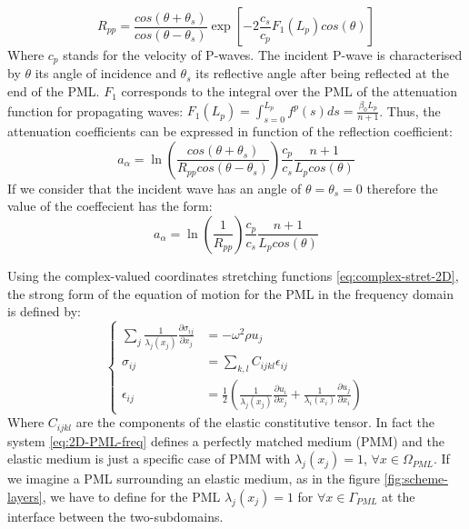 \begin{equation}
R_{pp} = \frac{cos(\theta+\theta_s)}{cos(\theta-\theta_s)} \exp\left[-2\frac{c_s}{c_p}F_1(L_p)cos(\theta)\right]
\label{eq:Rpp} 
\end{equation} 
Where $c_p$ stands for the velocity of P-waves. The incident P-wave is characterised by $\theta$ its angle of incidence and $\theta_s$ its reflective angle after being reflected at the end of the PML. $F_1$ corresponds to the integral over the PML of the attenuation function for propagating waves: $F_1(L_p) = \int_{s=0}^{L_p} f^p(s) ds = \frac{\beta_0 L_p}{n+1}$. Thus, the attenuation coefficients can be expressed in function of the reflection coefficient:
\begin{equation}
a_\alpha = \ln\left(\frac{cos(\theta+\theta_s)}{R_{pp}cos(\theta-\theta_s)} \right) \frac{c_p}{c_s} \frac{n+1}{L_p cos(\theta)}
\label{eq:alpha_kucu}
\end{equation} 
If we consider that the incident wave has an angle of $\theta = \theta_s = 0$ therefore the value of the coeffecient has the form:
\begin{equation}
a_\alpha = \ln\left(\frac{1}{R_{pp}} \right) \frac{c_p}{c_s} \frac{n+1}{L_p cos(\theta)}
\end{equation}
\par Using the complex-valued coordinates stretching functions \ref{eq:complex-stret-2D}, the strong form of the equation of motion for the PML in the frequency domain is defined by:
\begin{equation}
\begin{cases}
\sum_{j} \frac{1}{\lambda_j(x_j)} \frac{\partial \sigma_{ij}}{\partial x_j} & = - \omega^2 \rho u_j \\
\sigma_{ij} &= \sum_{k,l} C_{ijkl} \epsilon_{ij} \\
\epsilon_{ij} &= \frac{1}{2} \left(\frac{1}{\lambda_j(x_j)} \frac{\partial u_{i}}{\partial x_j} + \frac{1}{\lambda_i(x_i)} \frac{\partial u_{j}}{\partial x_i} \right)
\end{cases}
\label{eq:2D-PML-freq}
\end{equation} 
Where $C_{ijkl}$ are the components of the elastic constitutive tensor. In fact the system \ref{eq:2D-PML-freq} defines a perfectly matched medium (PMM) and the elastic medium is just a specific case of PMM with $\lambda_j(x_j) = 1$, $\forall x \in \Omega_{PML}$. If we imagine a PML surrounding an elastic medium, as in the figure \ref{fig:scheme-layers}, we have to define for the PML $\lambda_j(x_j) = 1$ for $\forall x \in \Gamma_{PML}$ at the interface between the two-subdomains. \\
